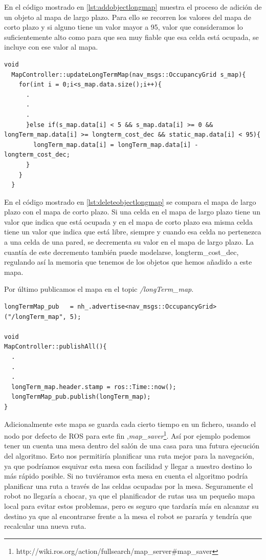 En el código mostrado en \ref{lst:addobjectlongmap} muestra el proceso de adición de un objeto al mapa de largo plazo. Para ello se recorren los valores del mapa de corto plazo y si alguno tiene un valor mayor a 95, valor que consideramos lo suficientemente alto como para que sea muy fiable que esa celda está ocupada, se incluye con ese valor al mapa.

\begin{lstlisting}[caption=Procedimiento para eliminar un objeto al mapa de largo plazo, label={lst:deleteobjectlongmap}]
  void
  MapController::updateLongTermMap(nav_msgs::OccupancyGrid s_map){
    for(int i = 0;i<s_map.data.size();i++){
      .
      .
      .
      }else if(s_map.data[i] < 5 && s_map.data[i] >= 0 && longTerm_map.data[i] >= longterm_cost_dec && static_map.data[i] < 95){
        longTerm_map.data[i] = longTerm_map.data[i] - longterm_cost_dec;
      }
    }
  } 

\end{lstlisting}

En el código mostrado en \ref{lst:deleteobjectlongmap} se compara el mapa de largo plazo con el mapa de corto plazo. Si una celda en el mapa de largo plazo tiene un valor que indica que está ocupada y en el mapa de corto plazo esa misma celda tiene un valor que indica que está libre, siempre y cuando esa celda no pertenezca a una celda de una pared, se decrementa su valor en el mapa de largo plazo. La cuantía de este decremento también puede modelarse, longterm\_cost\_dec, regulando así la memoria que tenemos de los objetos que hemos añadido a este mapa.\pagebreak

Por último publicamos el mapa en el topic \textit{/longTerm\_map}.

\begin{lstlisting}[caption=Publicación del mapa de largo plazo, label={lst:longmappublish}]
longTermMap_pub   = nh_.advertise<nav_msgs::OccupancyGrid>("/longTerm_map", 5); 

void
MapController::publishAll(){
  .
  .
  .
  longTerm_map.header.stamp = ros::Time::now();
  longTermMap_pub.publish(longTerm_map);
}
\end{lstlisting}

Adicionalmente este mapa se guarda cada cierto tiempo en un fichero, usando el nodo por defecto de ROS para este fin ,\textit{map\_saver}\footnote{http://wiki.ros.org/action/fullsearch/map\_server\#map\_saver}. Así por ejemplo podemos tener un cuenta una mesa dentro del salón de una casa para una futura ejecución del algoritmo. Esto nos permitiría planificar una ruta mejor para la navegación, ya que podríamos esquivar esta mesa con facilidad y llegar a nuestro destino lo más rápido posible. Si no tuviéramos esta mesa en cuenta el algoritmo podría planificar una ruta a través de las celdas ocupadas por la mesa. Seguramente el robot no llegaría a chocar, ya que el planificador de rutas usa un pequeño mapa local para evitar estos problemas, pero es seguro que tardaría más en alcanzar su destino ya que al encontrarse frente a la mesa el robot se pararía y tendría que recalcular una nueva ruta. 


